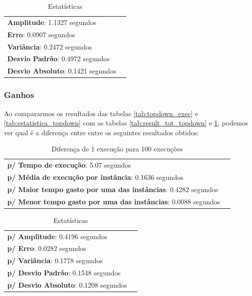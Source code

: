 \documentclass[a4paper, 12pt]{article}
\begin{document}

\begin{table}[!htb]
    \begin{tabular}{ll}
        {\bf Amplitude}: 1.1327 segundos\\
        {\bf Erro}: 0.0907 segundos\\
        {\bf Variância}: 0.2472 segundos\\
        {\bf Desvio Padrão}: 0.4972 segundos\\
        {\bf Desvio Absoluto}: 0.1421 segundos
    \end{tabular}
    \caption{Estatísticas}
    \label{tab:estatistica_tot_topdown}
\end{table}

\subsubsection{Ganhos}

Ao compararmos os resultados das tabelas \ref{tab:topdown_exec} e \ref{tab:estatistica_topdown} com as 
tabelas \ref{tab:result_tot_topdown} e \ref{tab:estatistica_tot_topdown}, podemos ver qual é a diferença entre 
entre os seguintes resultados obtidos:
\begin{table}[!htb]
    \begin{tabular}{ll}
        {\bf p/ Tempo de execução}: 5.07 segundos\\
        {\bf p/ Média de execução por instância}: 0.1636 segundos\\
        {\bf p/ Maior tempo gasto por uma das instâncias}: 0.4282 segundos\\
        {\bf p/ Menor tempo gasto por uma das instâncias}: 0.0088 segundos \\
    \end{tabular}
    \caption{Diferença de 1 execução para 100 execuções}
    \label{tab:diff_topdown}
\end{table}


\begin{table}[!htb]
    \begin{tabular}{ll}
        {\bf p/ Amplitude}: 0.4196 segundos\\
        {\bf p/ Erro}: 0.0282 segundos\\
        {\bf p/ Variância}: 0.1778 segundos\\
        {\bf p/ Desvio Padrão}: 0.1548 segundos\\
        {\bf p/ Desvio Absoluto}: 0.1208 segundos
    \end{tabular}
    \caption{Estatísticas}
    \label{tab:diff_estatistica_topdown}
\end{table}
\end{document}
